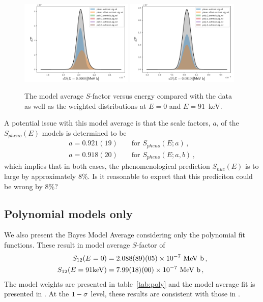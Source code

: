 \documentclass[prd,10pt,superscriptaddress,notitlepage,tightenlines,nofootinbib,floatfix]{revtex4-1}
\begin{document}
\begin{figure}
\includegraphics[width=0.48\textwidth]{figures/S_E0.0000_hist_all}
\includegraphics[width=0.48\textwidth]{figures/S_E0.0910_hist_all}
\caption{\label{fig:all_models}
The model average $S$-factor versus energy compared with the data as well as the weighted distributions at $E=0$ and $E=91$~keV.}
\end{figure}

A potential issue with this model average is that the scale factors, $a$, of the $S_{pheno}(E)$ models is determined to be
\begin{align}
&a = 0.921(19)& &\textrm{ for $S_{pheno}(E; a)$}\, ,&
\nonumber\\
&a = 0.918(20)& &\textrm{ for $S_{pheno}(E; a,b)$}\, ,&
\end{align}
which implies that in both cases, the phenomenological prediction $S_{nuc}(E)$ is to large by approximately 8\%.
Is it reasonable to expect that this prediciton could be wrong by 8\%?




\subsection{Polynomial models only}

We also present the Bayes Model Average considering only the polynomial fit functions.
These result in model average $S$-factor of
\begin{align}
S_{12}(E=0) &= 2.088(89)(05)\times10^{-7} \textrm{ MeV b}\, ,
\nonumber\\
S_{12}(E=91{\rm keV}) &= 7.99(18)(00)\times10^{-7} \textrm{ MeV b}\, ,
\end{align}
The model weights are presented in table~\ref{tab:poly} and the model average fit is presented in .
At the $1-{\sigma}$ level, these results are consistent with those in .
\end{document}
